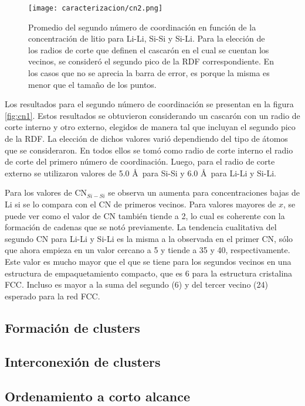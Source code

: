 \begin{figure}[th]
    \centering
    \texttt{[image: caracterizacion/cn2.png]}
    \caption{Promedio del segundo número de coordinación en función de la 
    concentración de litio para Li-Li, Si-Si y Si-Li. Para la elección de los 
    radios de corte que definen el cascarón en el cual se cuentan los vecinos,
    se consideró el segundo pico de la RDF correspondiente. En los casos que no 
    se aprecia la barra de error, es porque la misma es menor que el tamaño de 
    los puntos.}
    \label{fig:cn2}
\end{figure}
Los resultados para el segundo número de coordinación se presentan en la figura 
\ref{fig:cn1}. Estos resultados se obtuvieron considerando un cascarón con un 
radio de corte interno y otro externo, elegidos de manera tal que incluyan el 
segundo pico de la RDF. La elección de dichos valores varió dependiendo del tipo
de átomos que se consideraron. En todos ellos se tomó como radio de corte interno 
el radio de corte del primero número de coordinación. Luego, para el radio de 
corte externo se utilizaron valores de 5.0 \AA\ para Si-Si y 6.0 \AA\ para Li-Li
y Si-Li.

Para los valores de CN$_{Si-Si}$ se observa un aumenta para concentraciones bajas
de Li si se lo compara con el CN de primeros vecinos. Para valores mayores de $x$,
se puede ver como el valor de CN también tiende a 2, lo cual es coherente con la
formación de cadenas que se notó previamente. La tendencia cualitativa del segundo
CN para Li-Li y Si-Li es la misma a la observada en el primer CN, sólo que ahora
empieza en un valor cercano a 5 y tiende a 35 y 40, respectivamente. Este valor 
es mucho mayor que el que se tiene para los segundos vecinos en una estructura 
de empaquetamiento compacto, que es 6 para la estructura cristalina FCC. Incluso 
es mayor a la suma del segundo (6) y del tercer vecino (24) esperado para la red 
FCC.

\subsection{Formación de clusters}

\subsection{Interconexión de clusters}\label{s:intercionexion}

\subsection{Ordenamiento a corto alcance}

